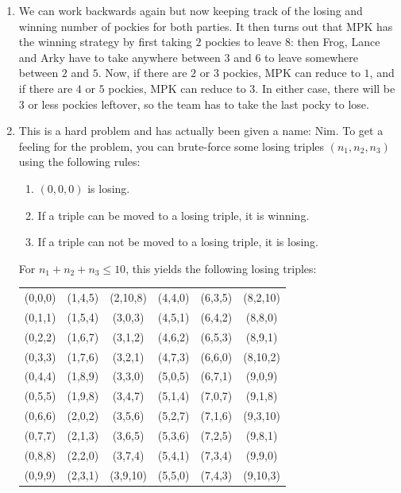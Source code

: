 \documentclass[11pt]{scrartcl}
\begin{document}
\begin{enumerate}[label=\textbf{C\arabic*}.]
\begin{enumerate}
        \item We can work backwards again but now keeping track of the losing and winning number of pockies for both parties. It then turns out that $\boxed{\text{MPK}}$ has the winning strategy by first taking $2$ pockies to leave $8$: then Frog, Lance and Arky have to take anywhere between $3$ and $6$ to leave somewhere between $2$ and $5$. Now, if there are $2$ or $3$ pockies, MPK can reduce to $1$, and if there are $4$ or $5$ pockies, MPK can reduce to $3$. In either case, there will be $3$ or less pockies leftover, so the team has to take the last pocky to lose.
        
        \item This is a hard problem and has actually been given a name: Nim. To get a feeling for the problem, you can brute-force some losing triples $(n_1, n_2, n_3)$ using the following rules:
        \begin{enumerate}
            \item $(0,0,0)$ is losing.
            \item If a triple can be moved to a losing triple, it is winning.
            \item If a triple can not be moved to a losing triple, it is losing.
        \end{enumerate}
        For $n_1 + n_2 + n_3 \le 10$, this yields the following losing triples:
        \begin{table}[]
\centering
\begin{tabular}{cccccc}
(0,0,0)   & (1,4,5)  & (2,10,8) & (4,4,0) & (6,3,5) & (8,2,10)  \\
(0,1,1)   & (1,5,4)  & (3,0,3)  & (4,5,1) & (6,4,2) & (8,8,0)   \\
(0,2,2)   & (1,6,7)  & (3,1,2)  & (4,6,2) & (6,5,3) & (8,9,1)   \\
(0,3,3)   & (1,7,6)  & (3,2,1)  & (4,7,3) & (6,6,0) & (8,10,2)  \\
(0,4,4)   & (1,8,9)  & (3,3,0)  & (5,0,5) & (6,7,1) & (9,0,9)   \\
(0,5,5)   & (1,9,8)  & (3,4,7)  & (5,1,4) & (7,0,7) & (9,1,8)   \\
(0,6,6)   & (2,0,2)  & (3,5,6)  & (5,2,7) & (7,1,6) & (9,3,10)  \\
(0,7,7)   & (2,1,3)  & (3,6,5)  & (5,3,6) & (7,2,5) & (9,8,1)   \\
(0,8,8)   & (2,2,0)  & (3,7,4)  & (5,4,1) & (7,3,4) & (9,9,0)   \\
(0,9,9)   & (2,3,1)  & (3,9,10) & (5,5,0) & (7,4,3) & (9,10,3)  \\

\end{tabular}
\end{table}
\end{enumerate}
\end{enumerate}
\end{document}
